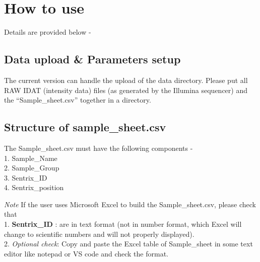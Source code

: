 \documentclass[
  a4paper,
  oneside,
  open=any]{scrreport}
\begin{document}
\hypertarget{how-to-use-1}{%
\section{How to use}\label{how-to-use-1}}

Details are provided below -

\hypertarget{data-upload-parameters-setup}{%
\subsection{Data upload \& Parameters
setup}\label{data-upload-parameters-setup}}

The current version can handle the upload of the data directory. Please
put all RAW IDAT (intensity data) files (as generated by the Illumina
sequencer) and the ``Sample\_sheet.csv'' together in a directory.

\hypertarget{structure-of-sample_sheet.csv}{%
\subsection{Structure of
sample\_sheet.csv}\label{structure-of-sample_sheet.csv}}

The Sample\_sheet.csv must have the following components -\\
1. Sample\_Name\\
2. Sample\_Group\\
3. Sentrix\_ID\\
4. Sentrix\_position

\begin{tcolorbox}[enhanced jigsaw, bottomrule=.15mm, left=2mm, coltitle=black, breakable, colback=white, arc=.35mm, rightrule=.15mm, opacitybacktitle=0.6, toptitle=1mm, leftrule=.75mm, toprule=.15mm, bottomtitle=1mm, opacityback=0, colbacktitle=quarto-callout-warning-color!10!white, titlerule=0mm, colframe=quarto-callout-warning-color-frame, title=\textcolor{quarto-callout-warning-color}{\faExclamationTriangle}\hspace{0.5em}{Warning}]

\emph{Note} If the user uses Microsoft Excel to build the
Sample\_sheet.csv, please check that\\
1. \textbf{Sentrix\_ID} : are in text format (not in number format,
which Excel will change to scientific numbers and will not properly
displayed).\\
2. \emph{Optional check}: Copy and paste the Excel table of
Sample\_sheet in some text editor like notepad or VS code and check the
format.

\end{tcolorbox}
\end{document}
